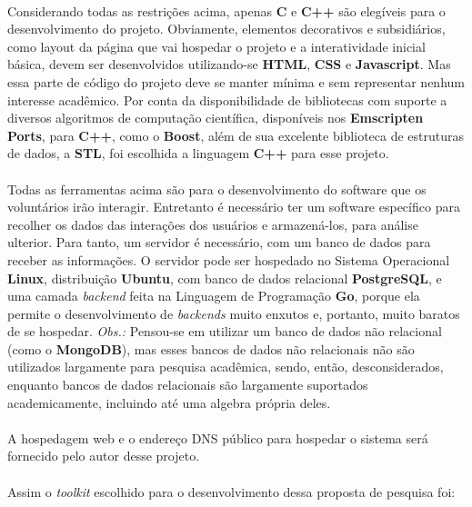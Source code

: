 \documentclass{article}
\begin{document}
	\paragraph{}
	Considerando todas as restrições acima, apenas \textbf{C} e \textbf{C++} são elegíveis para o desenvolvimento do projeto. Obviamente, elementos decorativos e subsidiários, como layout da página que vai hospedar o projeto e a interatividade inicial básica, devem ser desenvolvidos utilizando-se \textbf{HTML}, \textbf{CSS} e \textbf{Javascript}. Mas essa parte de código do projeto deve se manter mínima e sem representar nenhum interesse acadêmico. Por conta da disponibilidade de bibliotecas com suporte a diversos algoritmos de computação científica, disponíveis nos \textbf{Emscripten Ports}, para \textbf{C++}, como o \textbf{Boost}, além de sua excelente biblioteca de estruturas de dados, a \textbf{STL}, foi escolhida a linguagem \textbf{C++} para esse projeto.
	
	\paragraph{}
	Todas as ferramentas acima são para o desenvolvimento do software que os voluntários irão interagir. Entretanto é necessário ter um software específico para recolher os dados das interações dos usuários e armazená-los, para análise ulterior. Para tanto, um servidor é necessário, com um banco de dados para receber as informações. O servidor pode ser hospedado no Sistema Operacional \textbf{Linux}, distribuição \textbf{Ubuntu}, com banco de dados relacional \textbf{PostgreSQL}, e uma camada \textit{backend} feita na Linguagem de Programação \textbf{Go}, porque ela permite o desenvolvimento de \textit{backends} muito enxutos e, portanto, muito baratos de se hospedar. \textit{Obs.:} Pensou-se em utilizar um banco de dados não relacional (como o \textbf{MongoDB}), mas esses bancos de dados não relacionais não são utilizados largamente para pesquisa acadêmica, sendo, então, desconsiderados, enquanto bancos de dados relacionais são largamente suportados academicamente, incluindo até uma algebra própria deles.
	
	\paragraph{}
	A hospedagem web e o endereço DNS público para hospedar o sistema será fornecido pelo autor desse projeto.
	
	\paragraph{}
	Assim o \textit{toolkit} escolhido para o desenvolvimento dessa proposta de pesquisa foi:
	
\end{document}
